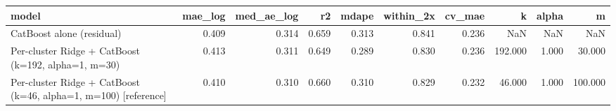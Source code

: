 \begin{tabular}{lrrrrrrrrr}
\toprule
model & mae_log & med_ae_log & r2 & mdape & within_2x & cv_mae & k & alpha & m \\
\midrule
CatBoost alone (residual) & 0.409 & 0.314 & 0.659 & 0.313 & 0.841 & 0.236 & NaN & NaN & NaN \\
Per-cluster Ridge + CatBoost (k=192, alpha=1, m=30) & 0.413 & 0.311 & 0.649 & 0.289 & 0.830 & 0.236 & 192.000 & 1.000 & 30.000 \\
Per-cluster Ridge + CatBoost (k=46, alpha=1, m=100) [reference] & 0.410 & 0.310 & 0.660 & 0.310 & 0.829 & 0.232 & 46.000 & 1.000 & 100.000 \\
\bottomrule
\end{tabular}
